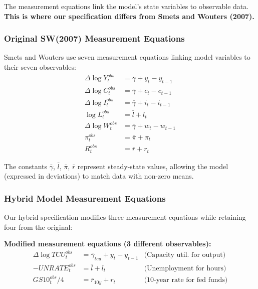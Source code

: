\documentclass[12pt]{article}
\begin{document}
The measurement equations link the model's state variables to observable data. \textbf{This is where our specification differs from Smets and Wouters (2007).}

\subsubsection{Original SW(2007) Measurement Equations}

Smets and Wouters use seven measurement equations linking model variables to their seven observables:
\begin{align}
\Delta\log Y_t^{obs} &= \bar{\gamma} + y_t - y_{t-1} \label{eq:meas_y_orig}\\
\Delta\log C_t^{obs} &= \bar{\gamma} + c_t - c_{t-1} \label{eq:meas_c_orig}\\
\Delta\log I_t^{obs} &= \bar{\gamma} + i_t - i_{t-1} \label{eq:meas_i_orig}\\
\log L_t^{obs} &= \bar{l} + l_t \label{eq:meas_l_orig}\\
\Delta\log W_t^{obs} &= \bar{\gamma} + w_t - w_{t-1} \label{eq:meas_w_orig}\\
\pi_t^{obs} &= \bar{\pi} + \pi_t \label{eq:meas_pi_orig}\\
R_t^{obs} &= \bar{r} + r_t \label{eq:meas_r_orig}
\end{align}

The constants $\bar{\gamma}$, $\bar{l}$, $\bar{\pi}$, $\bar{r}$ represent steady-state values, allowing the model (expressed in deviations) to match data with non-zero means.

\subsubsection{Hybrid Model Measurement Equations}

Our hybrid specification modifies three measurement equations while retaining four from the original:

\textbf{Modified measurement equations (3 different observables):}
\begin{align}
\Delta\log TCU_t^{obs} &= \bar{\gamma}_{tcu} + y_t - y_{t-1} & \text{(Capacity util. for output)} \label{eq:meas_tcu}\\
-UNRATE_t^{obs} &= \bar{l} + l_t & \text{(Unemployment for hours)} \label{eq:meas_unemp}\\
GS10_t^{obs}/4 &= \bar{r}_{10y} + r_t & \text{(10-year rate for fed funds)} \label{eq:meas_10y}
\end{align}
\end{document}
